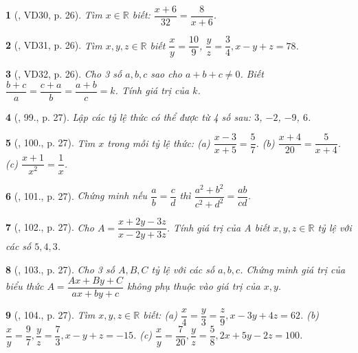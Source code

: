 \documentclass{article}
\newtheorem{baitoan}{}
\begin{document}
\begin{baitoan}[\cite{Tuyen_Toan_7}, VD30, p. 26]
	Tìm $x\in\mathbb{R}$ biết: $\dfrac{x + 6}{32} = \dfrac{8}{x + 6}$.
\end{baitoan}

\begin{baitoan}[\cite{Tuyen_Toan_7}, VD31, p. 26]
	Tìm $x,y,z\in\mathbb{R}$ biết $\dfrac{x}{y} = \dfrac{10}{9}$, $\dfrac{y}{z} = \dfrac{3}{4},x - y + z = 78$.
\end{baitoan}

\begin{baitoan}[\cite{Tuyen_Toan_7}, VD32, p. 26]
	Cho 3 số $a,b,c$ sao cho $a + b + c\ne 0$. Biết $\dfrac{b + c}{a} = \dfrac{c + a}{b} = \dfrac{a + b}{c} = k$. Tính giá trị của $k$.
\end{baitoan}

\begin{baitoan}[\cite{Tuyen_Toan_7}, 99., p. 27]
	Lập các tỷ lệ thức có thể được từ 4 số sau: $3$, $-2$, $-9$, $6$.
\end{baitoan}

\begin{baitoan}[\cite{Tuyen_Toan_7}, 100., p. 27]
	Tìm $x$ trong mỗi tỷ lệ thức: (a) $\dfrac{x - 3}{x + 5} = \dfrac{5}{7}$. (b) $\dfrac{x + 4}{20} = \dfrac{5}{x + 4}$. (c) $\dfrac{x + 1}{x^2} = \dfrac{1}{x}$.
\end{baitoan}

\begin{baitoan}[\cite{Tuyen_Toan_7}, 101., p. 27]
	Chứng minh nếu $\dfrac{a}{b} = \dfrac{c}{d}$ thì $\dfrac{a^2 + b^2}{c^2 + d^2} = \dfrac{ab}{cd}$.
\end{baitoan}

\begin{baitoan}[\cite{Tuyen_Toan_7}, 102., p. 27]
	Cho $A = \dfrac{x + 2y - 3z}{x - 2y + 3z}$. Tính giá trị của A biết $x,y,z\in\mathbb{R}$ tỷ lệ với các số $5,4,3$.
\end{baitoan}

\begin{baitoan}[\cite{Tuyen_Toan_7}, 103., p. 27]
	Cho 3 số $A,B,C$ tỷ lệ với các số $a,b,c$. Chứng minh giá trị của biểu thức $A = \dfrac{Ax + By + C}{ax + by + c}$ không phụ thuộc vào giá trị của $x,y$.
\end{baitoan}

\begin{baitoan}[\cite{Tuyen_Toan_7}, 104., p. 27]
	Tìm $x,y,z\in\mathbb{R}$ biết: (a) $\dfrac{x}{4} = \dfrac{y}{3} = \dfrac{z}{9},x - 3y + 4z = 62$. (b) $\dfrac{x}{y} = \dfrac{9}{7},\dfrac{y}{z} = \dfrac{7}{3},x - y + z = -15$. (c) $\dfrac{x}{y} = \dfrac{7}{20},\dfrac{y}{z} = \dfrac{5}{8},2x + 5y - 2z = 100$.
\end{baitoan}
\end{document}
